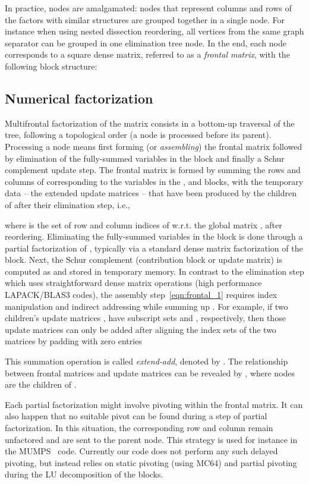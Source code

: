 \documentclass{article}
\begin{document}
In practice, nodes are amalgamated: nodes that represent columns and
rows of the factors with similar structures are grouped together in a
single node. For instance when using nested dissection reordering, all
vertices from the same graph separator can be grouped in one
elimination tree node. In the end, each node corresponds to a square
dense matrix, referred to as a \emph{frontal matrix}, with the
following  block structure:


\subsection{Numerical factorization}
Multifrontal factorization of the matrix consists in a bottom-up
traversal of the tree, following a topological order (a node is
processed before its parent). Processing a node means first forming
(or \emph{assembling}) the frontal matrix followed by elimination of
the fully-summed variables in the  block and finally a Schur
complement update step. The frontal matrix  is formed
by summing the rows and columns of  corresponding to the variables
in the ,  and  blocks, with the temporary
data -- the extended update matrices  -- that have
been produced by the children of  after their elimination step,
i.e.,

where  is the set
of row and column indices of  w.r.t. the global matrix
, after reordering. Eliminating the fully-summed variables in the
 block is done through a partial factorization of
, typically via a standard dense matrix factorization
of the  block.
Next, the Schur complement (contribution block or update matrix) is
computed as  and
stored in temporary memory.
In contrast to the elimination step which uses straightforward dense
matrix operations (high performance LAPACK/BLAS3 codes), the assembly
step~\eqref{eqn:frontal_1} requires index manipulation and indirect
addressing while summing up . For example, if two
children's update matrices , have subscript sets
 and ,
respectively, then those update matrices can only be added after
aligning the index sets of the two matrices by padding with zero
entries

This summation operation is called \textit{extend-add}, denoted by
. The relationship between frontal matrices and update
matrices can be revealed by , where nodes  are
the children of .

Each partial factorization might involve pivoting within the frontal
matrix. It can also happen that no suitable pivot can be found during
a step of partial factorization. In this situation, the corresponding
row and column remain unfactored and are sent to the parent node. This
strategy is used for instance in the MUMPS~\cite{amestoy2001fully}
code. Currently our code does not perform any such delayed pivoting,
but instead relies on static pivoting (using MC64) and partial
pivoting during the LU decomposition of the  blocks.
\end{document}
